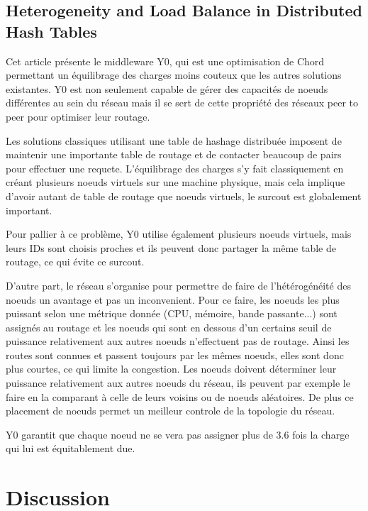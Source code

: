 \documentclass{article}
\begin{document}
\subsection{Heterogeneity and Load Balance in Distributed Hash Tables
\cite{1497926}
}
Cet article présente le middleware Y0, qui est une optimisation de Chord permettant un équilibrage des charges moins
couteux que les autres solutions existantes. Y0 est non seulement capable de gérer des capacités de noeuds
différentes au sein du réseau mais il se sert de cette propriété des réseaux peer to peer pour optimiser leur routage.


Les solutions classiques utilisant une table de hashage distribuée imposent de maintenir une importante table
de routage et de contacter beaucoup de pairs pour effectuer une requete. L'équilibrage des charges s'y fait
classiquement en créant plusieurs noeuds virtuels sur une machine physique, mais cela implique d'avoir
autant de table de routage que noeuds virtuels, le surcout est globalement important.

Pour pallier à ce problème, Y0 utilise également plusieurs noeuds virtuels, mais leurs IDs sont choisis
proches et ils peuvent donc partager la même table de routage, ce qui évite ce surcout.

D'autre part, le réseau s'organise pour permettre de faire de l'hétérogénéité des noeuds un avantage et
pas un inconvenient. Pour ce faire, les noeuds les plus puissant selon une métrique donnée (CPU, mémoire,
bande passante...) sont assignés au routage et les noeuds qui sont en dessous d'un certains seuil de puissance
relativement aux autres noeuds n'effectuent pas de routage. Ainsi les routes sont connues et passent toujours
par les mêmes noeuds, elles sont donc plus courtes, ce qui limite la congestion. Les noeuds doivent déterminer
leur puissance relativement aux autres noeuds du réseau, ils peuvent par exemple le faire en la comparant à celle
de leurs voisins ou de noeuds aléatoires. De plus ce placement de noeuds permet un meilleur controle de la topologie
du réseau.

Y0 garantit que chaque noeud ne se vera pas assigner plus de 3.6 fois la charge qui lui est équitablement due.

\newpage




\newpage

\section{Discussion}
\end{document}

